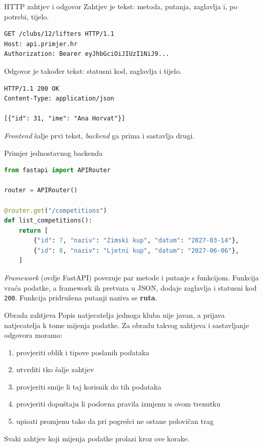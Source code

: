 \begin{frame}[fragile]{HTTP zahtjev i odgovor}
Zahtjev je tekst: metoda, putanja, zaglavlja i, po potrebi, tijelo.

\begin{lstlisting}
GET /clubs/12/lifters HTTP/1.1
Host: api.primjer.hr
Authorization: Bearer eyJhbGciOiJIUzI1NiJ9...
\end{lstlisting}

Odgovor je također tekst: statusni kod, zaglavlja i tijelo.

\begin{lstlisting}
HTTP/1.1 200 OK
Content-Type: application/json

[{"id": 31, "ime": "Ana Horvat"}]
\end{lstlisting}

\vspace{0.2em}
\emph{Frontend} šalje prvi tekst, \emph{backend} ga prima i sastavlja drugi.
\end{frame}

\begin{frame}[fragile]{Primjer jednostavnog backenda}
\begin{lstlisting}[language=python]
from fastapi import APIRouter

router = APIRouter()

@router.get("/competitions")
def list_competitions():
    return [
        {"id": 7, "naziv": "Zimski kup", "datum": "2027-03-14"},
        {"id": 8, "naziv": "Ljetni kup", "datum": "2027-06-06"},
    ]
\end{lstlisting}

\vspace{0.4em}
\emph{Framework} (ovdje FastAPI) povezuje par metode i putanje s funkcijom. Funkcija vraća podatke, a framework ih pretvara u JSON, dodaje zaglavlja i statusni kod \texttt{200}. Funkcija pridružena putanji naziva se \textbf{ruta}.
\end{frame}

\begin{frame}{Obrada zahtjeva}
Popis natjecatelja jednoga kluba nije javan, a prijava natjecatelja k tome mijenja podatke. Za obradu takvog zahtjeva i sastavljanje odgovora moramo:

\vspace{0.4em}
\begin{enumerate}
  \item provjeriti oblik i tipove poslanih podataka
  \item utvrditi tko šalje zahtjev
  \item provjeriti smije li taj korisnik do tih podataka
  \item provjeriti dopuštaju li poslovna pravila izmjenu u ovom trenutku
  \item upisati promjenu tako da pri pogrešci ne ostane polovičan trag
\end{enumerate}

\vspace{0.4em}
Svaki zahtjev koji mijenja podatke prolazi kroz ove korake.
\end{frame}

